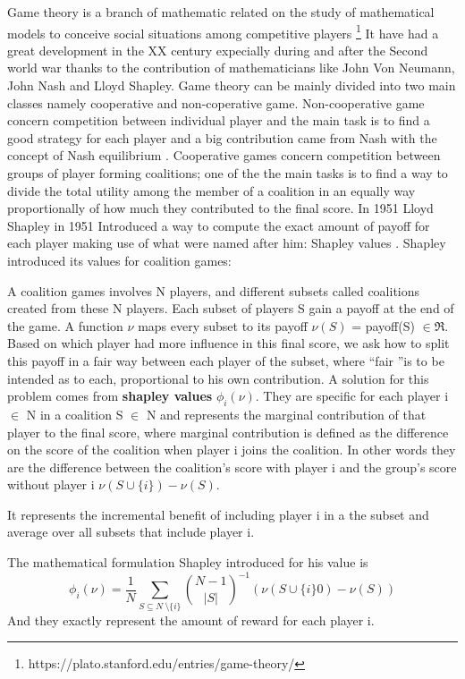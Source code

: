 \documentclass[a4paper,11pt]{article}
\begin{document}
Game theory is a branch of mathematic related on the study of mathematical models to  conceive social situations among competitive players \footnote{https://plato.stanford.edu/entries/game-theory/}
It have had a great development in the XX century expecially during and after the Second world war thanks to the contribution of mathematicians like John Von Neumann, John Nash and Lloyd Shapley.
Game theory can be mainly divided into two main classes namely cooperative and non-coperative game.
Non-cooperative game concern competition between individual player and the main task is to find a good strategy for each player and a big contribution came from Nash with the concept of Nash equilibrium \cite{nash-1950}.
Cooperative games concern competition between groups of player forming coalitions; one of the the main tasks is to find a way to divide the total utility among the member of a coalition in an equally way proportionally of how much they contributed to the final score.
In 1951 Lloyd Shapley in 1951 Introduced a way to compute the exact amount of payoff for each player making use of what were named after him: Shapley values \cite{shap-1951}\cite{shap-1953}.
Shapley introduced its values for coalition games:

A coalition games involves N players, and different subsets called coalitions created from these N players.
Each subset of players S gain a payoff at the end of the game.
A function $\nu$ maps every subset to its payoff $\nu(S)$ = payoff(S) $\in \Re$.
Based on which player had more influence in this final score, we ask how to split this payoff in a fair way between each player of the subset, where \textquotedblleft fair \textquotedblright is to be intended as to each, proportional to his own contribution.
A solution for this problem comes from \textbf{shapley values} $\phi_i(\nu)$.
They are specific for each player i $\in$ N in a coalition S $\in$ N and represents the marginal contribution of that player to the final score, where marginal contribution is defined as the difference on the score of the coalition when player i joins the coalition.
In other words they are the difference between the coalition's score with player i and the group's score without player i $\nu (S \cup \{ i \}) - \nu(S)$.

It represents the incremental benefit of including player i in a the subset and average over all subsets that include player i.


The mathematical formulation Shapley introduced for his value is
\begin{equation}
\phi_i(\nu) = \frac{1}{N} \sum_{S\subseteq N\ \setminus \{ i \} }  {N- 1 \choose |S|}^{-1} ( \nu (S \cup \{ i \} 0) - \nu(S) )
\end{equation}
And they exactly represent the amount of reward for each player i.
\end{document}
